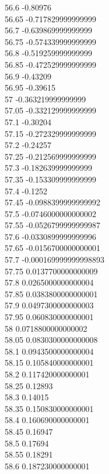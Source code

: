 {56.6	-0.80976\\
56.65	-0.717829999999999\\
56.7	-0.639869999999999\\
56.75	-0.574339999999999\\
56.8	-0.519259999999999\\
56.85	-0.472529999999999\\
56.9	-0.43209\\
56.95	-0.39615\\
57	-0.363219999999999\\
57.05	-0.332129999999999\\
57.1	-0.30204\\
57.15	-0.272329999999999\\
57.2	-0.24257\\
57.25	-0.212569999999999\\
57.3	-0.182639999999999\\
57.35	-0.153309999999999\\
57.4	-0.1252\\
57.45	-0.0988399999999992\\
57.5	-0.0746000000000002\\
57.55	-0.0526799999999987\\
57.6	-0.0330899999999996\\
57.65	-0.0156700000000001\\
57.7	-0.000169999999998893\\
57.75	0.0137700000000009\\
57.8	0.0265000000000004\\
57.85	0.0383800000000001\\
57.9	0.0497300000000003\\
57.95	0.060830000000001\\
58	0.0718800000000002\\
58.05	0.0830300000000008\\
58.1	0.0943500000000004\\
58.15	0.105840000000001\\
58.2	0.117420000000001\\
58.25	0.12893\\
58.3	0.14015\\
58.35	0.150830000000001\\
58.4	0.160690000000001\\
58.45	0.16947\\
58.5	0.17694\\
58.55	0.18291\\
58.6	0.187230000000001\\
}
